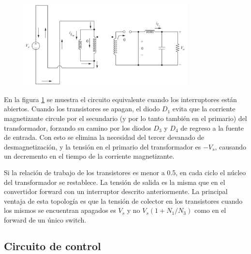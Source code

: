 \begin{figure}[H]
    \centering
    \includegraphics[width=0.8\textwidth]{images/hart/forward_doble_switch_open.png}
    \caption{}
    \label{fig:forward_doble_switch_open}
\end{figure}

En la figura \ref{fig:forward_doble_switch_open} se muestra el circuito equivalente cuando los interruptores están abiertos.  
Cuando los transistores se apagan, el diodo $D_1$ evita que la corriente magnetizante circule por el secundario 
(y por lo tanto también en el primario) del transformador, forzando su camino por los diodos $D_3$ y $D_4$ de regreso a la fuente de entrada.  
Con esto se elimina la necesidad del tercer devanado de desmagnetización, y la tensión en el primario del transformador es $-V_s$, causando un decremento en el tiempo de la corriente magnetizante. 

Si la relación de trabajo de los transistores es menor a 0.5, en cada ciclo el núcleo del transformador se restablece.
La tensión de salida es la misma que en el convertidor forward con un interruptor descrito anteriormente.
La principal ventaja de esta topología es que la tensión de colector en los transistores cuando los mismos se encuentran apagados 
es $V_s$ y no $V_s\left(1+N_1/N_3\right)$ como en el forward de un único switch.

\subsection{Circuito de control}


